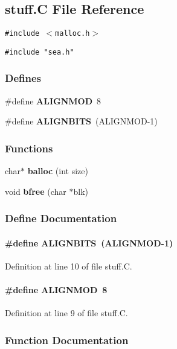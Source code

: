 \subsection{stuff.C File Reference}
\label{stuff.C}
{\tt \#include $<$malloc.h$>$}\par
{\tt \#include "sea.h"}\par
\subsubsection*{Defines}
\begin{CompactItemize}
\item 
\#define {\bf ALIGNMOD}\ 8
\item 
\#define {\bf ALIGNBITS}\ (ALIGNMOD-1)
\end{CompactItemize}
\subsubsection*{Functions}
\begin{CompactItemize}
\item 
char$\ast$ {\bf balloc} (int size)
\item 
void {\bf bfree} (char $\ast$blk)
\end{CompactItemize}


\subsubsection{Define Documentation}
\label{stuff.C_a1}
\paragraph{\setlength{\rightskip}{0pt plus 5cm}\#define ALIGNBITS\ (ALIGNMOD-1)}\hfill



Definition at line 10 of file stuff.C.\label{stuff.C_a0}
\paragraph{\setlength{\rightskip}{0pt plus 5cm}\#define ALIGNMOD\ 8}\hfill



Definition at line 9 of file stuff.C.

\subsubsection{Function Documentation}
\label{stuff.C_a2}

